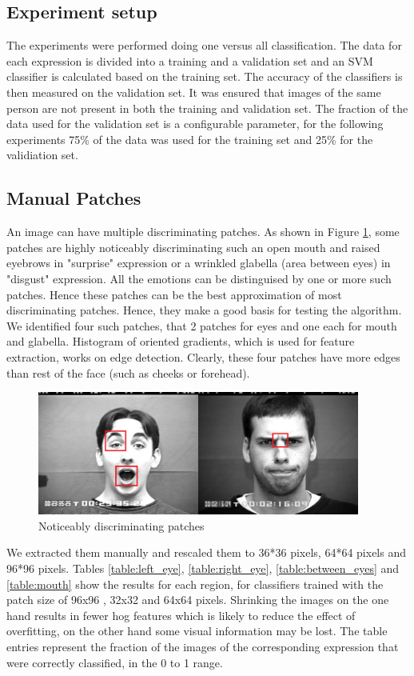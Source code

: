 \subsection{Experiment setup}
The experiments were performed doing one versus all classification. The data for each expression is divided into a training and a validation set and an SVM
classifier is calculated based on the training set. The accuracy of the classifiers is then measured on the validation set. It was ensured that images of the same
person are not present in both the training and validation set. The fraction of the data used for the validation set is a configurable parameter, for the 
following experiments 75\% of the data was used for the training set and 25\% for the validiation set. 

\subsection{Manual Patches}

An image can have multiple discriminating patches. As shown in Figure \ref{fig:manual_patch}, some patches are highly noticeably discriminating such an open mouth and raised eyebrows in "surprise" expression or a wrinkled glabella (area between eyes) in "disgust" expression. All the emotions can be distinguised by one or more such patches. Hence these patches can be the best approximation of most discriminating patches. Hence, they make a good basis for testing the algorithm.  We identified four such patches, that 2 patches for eyes and one each for mouth and glabella.  Histogram of oriented gradients, which is used for feature extraction, works on edge detection. Clearly, these four patches have more edges than rest of the face (such as cheeks or forehead).

\begin{figure}
\centering
\includegraphics[width=300pt]{manual_patch.png}
  \caption{Noticeably discriminating patches}
  \label{fig:manual_patch}
\end{figure}

We extracted them manually and rescaled them to 36*36 pixels, 64*64 pixels and 96*96 pixels. Tables \ref{table:left_eye}, \ref{table:right_eye}, \ref{table:between_eyes} and \ref{table:mouth} show the results for each region, for classifiers trained  with the  patch size of 96x96 , 32x32 and 64x64 pixels. Shrinking the images on the one hand results in fewer hog features which is likely to reduce the effect of overfitting, on the other hand some visual information may be lost. The table entries represent the fraction of the images of the corresponding expression that were correctly classified, in the 0 to 1 range.

